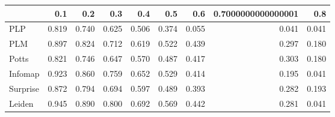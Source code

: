 \begin{tabular}{lrrrrrrrr}
\toprule
{} &   0.1 &   0.2 &   0.3 &   0.4 &   0.5 &   0.6 & 0.7000000000000001 &   0.8 \\
\midrule
PLP      & 0.819 & 0.740 & 0.625 & 0.506 & 0.374 & 0.055 &              0.041 & 0.041 \\
PLM      & 0.897 & 0.824 & 0.712 & 0.619 & 0.522 & 0.439 &              0.297 & 0.180 \\
Potts    & 0.821 & 0.746 & 0.647 & 0.570 & 0.487 & 0.417 &              0.303 & 0.180 \\
Infomap  & 0.923 & 0.860 & 0.759 & 0.652 & 0.529 & 0.414 &              0.195 & 0.041 \\
Surprise & 0.872 & 0.794 & 0.694 & 0.597 & 0.489 & 0.393 &              0.282 & 0.193 \\
Leiden   & 0.945 & 0.890 & 0.800 & 0.692 & 0.569 & 0.442 &              0.281 & 0.041 \\
\bottomrule
\end{tabular}
